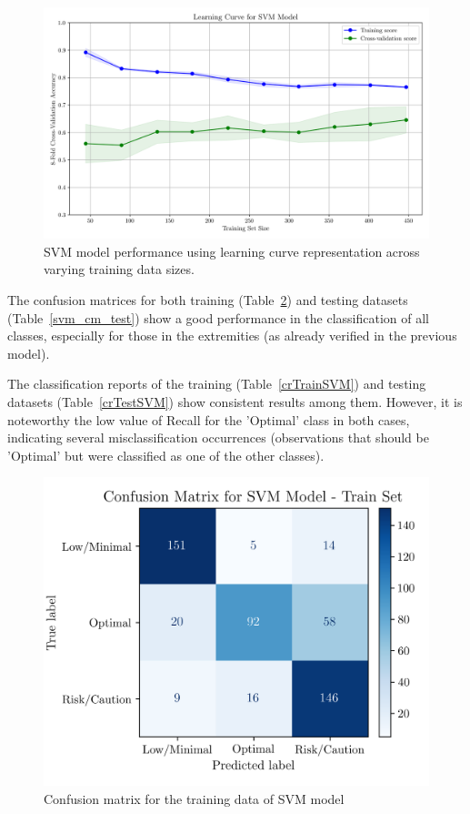 \documentclass[conference]{IEEEtran}
\begin{document}
\begin{figure}[H]
    \centering
    \includegraphics[width=1\linewidth]{assets/SVM_LearningCurve.png}
    \caption{SVM model performance using learning curve representation across varying training data sizes.}
    \label{svm_learningcurve}
\end{figure} %

The confusion matrices for both training (Table~\ref{svm_cm_train}) and  testing datasets (Table~\ref{svm_cm_test}) show a good performance in the classification of all classes, especially for those in the extremities (as already verified in the previous model).

The classification reports of the training (Table~\ref{crTrainSVM}) and testing datasets (Table~\ref{crTestSVM}) show consistent results among them. However, it is noteworthy the low value of Recall for the 'Optimal' class in both cases, indicating several misclassification occurrences (observations that should be 'Optimal' but were classified as one of the other classes). 

\begin{figure}[H]
    \centering
    \includegraphics[width=1\linewidth]{assets/SVM_ConfusionMatrixTrain.png}
    \caption{Confusion matrix for the training data of SVM model}
    \label{svm_cm_train}
\end{figure} %
\end{document}
